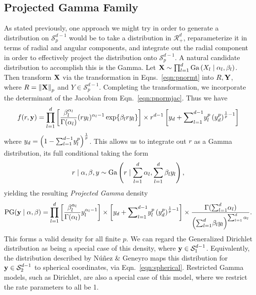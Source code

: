 \subsection{Projected Gamma Family}
As stated previously, one approach we might try in order to generate a distribution on
  $\mathcal{S}_{p}^{d-1}$ would be to take a distribution in $\mathcal{R}_{+}^d$, reparameterize
  it in terms of radial and angular components, and integrate out the radial component in order to
  effectively project the distribution onto $\mathcal{S}_{p}^{d-1}$.  A natural candidate distribution
  to accomplish this is the Gamma.  Let ${\bf X} \sim \prod_{l = 1}^d\text{Ga}\left(X_l\mid\alpha_l,\beta_l\right)$.
  Then transform ${\bf X}$ via the transformation in Eqns.~\ref{eqn:pnormt} into $R,{\bf Y}$, where
  $R = \left\lVert {\bf X} \right\rVert_{p}$ and $Y\in \mathcal{S}_{p}^{d-1}$.  Completing the transformation, we
  incorporate the determinant of the Jacobian from Eqn.~\ref{eqn:pnormjac}.  Thus we have
  \begin{equation}
    \label{eqn:protopg}
    f(r,{\bf y}) = \prod_{l = 1}^{d}
      \left[\frac{\beta_l^{\alpha_l}}{\Gamma(\alpha_l)}(ry_l)^{\alpha_l - 1}\exp\lbrace \beta_lry_l\rbrace\right]
      \times r^{d-1}\left[y_d + {\small \sum}_{l = 1}^{d-1}y_l^p\left(y_d^p\right)^{\frac{1}{p} - 1}\right]
  \end{equation}
  where $y_d = \left(1 - {\small \sum}_{l = 1}^{d-1}y_l^p\right)^{\frac{1}{p}}$.  This allows us to
  integrate out $r$ as a Gamma distribution, its full conditional taking the form
  \begin{equation}
    \label{eqn:rfullcond}
    r\mid{\bf \alpha},{\bf \beta}, y \sim \text{Ga}\left(r\mid\sum_{l = 1}^d \alpha_l, \sum_{l = 1}^d \beta_ly_l\right),
  \end{equation}
  yielding the resulting \emph{Projected Gamma} density
  \begin{equation}
    \text{PG}({\bf y}\mid{\bf \alpha},{\bf \beta}) = \prod_{l = 1}^d\left[\frac{\beta_l^{\alpha_l}}{\Gamma(\alpha_l)}y_l^{\alpha_l - 1}\right]
      \times \left[y_d + {\small \sum}_{l = 1}^{d-1}y_l^p\left(y_d^p\right)^{\frac{1}{p} - 1}\right]
      \times \frac{\Gamma({\small\sum}_{l = 1}^d\alpha_l)}{\left({\small\sum}_{l = 1}^d \beta_ly_l\right)^{{\small\sum_{l = 1}^d \alpha_l}}}.
  \end{equation}
  This forms a valid density for all finite $p$.  We can regard the Generalized Dirichlet distribution
  as being a special case of this density, where ${\bf y}\in \mathcal{S}_{1}^{d-1}$.  Equivalently,
  the distribution described by N{\'u}{\~n}ez \& Geneyro\cite{nunez2019} maps this distribution
  for ${\bf y}\in \mathcal{S}_{2}^{d-1}$ to spherical coordinates, via Eqn.~\ref{eqn:spherical}.
  Restricted Gamma models, such as Dirichlet, are also a special case of this model, where we restrict
  the rate parameters to all be 1.

